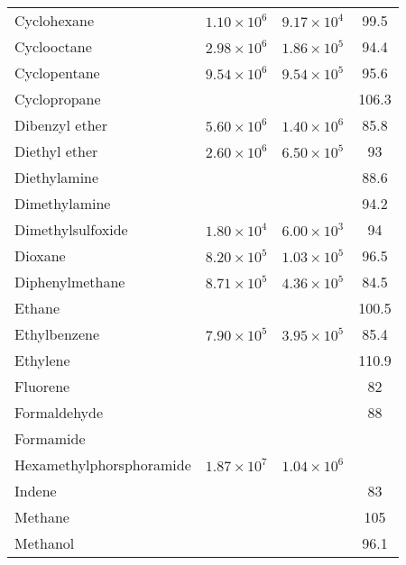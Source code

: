 \begin{center}
\begin{longtable}{l | c c c}
 Cyclohexane                    & $ 1.10 \times 10^6$ & $9.17 \times 10^4 $ &      99.5 \\
 Cyclooctane                    & $ 2.98 \times 10^6$ & $1.86 \times 10^5 $ &      94.4 \\
 Cyclopentane                   & $ 9.54 \times 10^6$ & $9.54 \times 10^5 $ &      95.6 \\
 Cyclopropane                   & $            $ & $            $ &     106.3 \\
 Dibenzyl ether                 & $ 5.60 \times 10^6$ & $1.40 \times 10^6 $ &      85.8 \\
 Diethyl ether                  & $ 2.60 \times 10^6$ & $6.50 \times 10^5 $ &        93 \\
 Diethylamine                   & $            $ & $            $ &      88.6 \\
 Dimethylamine                  & $            $ & $            $ &      94.2 \\
 Dimethylsulfoxide              & $ 1.80 \times 10^4$ & $6.00 \times 10^3 $ &        94 \\
 Dioxane                        & $ 8.20 \times 10^5$ & $1.03 \times 10^5 $ &      96.5 \\
 Diphenylmethane                & $ 8.71 \times 10^5$ & $4.36 \times 10^5 $ &      84.5 \\
 Ethane                         & $            $ & $            $ &     100.5 \\
 Ethylbenzene                   & $ 7.90 \times 10^5$ & $3.95 \times 10^5 $ &      85.4 \\
 Ethylene                       & $            $ & $            $ &     110.9 \\
 Fluorene                       & $            $ & $            $ &        82 \\
 Formaldehyde                   & $            $ & $            $ &        88 \\
 Formamide                      & $            $ & $            $ &           \\
 Hexamethylphorsphoramide       & $ 1.87 \times 10^7$ & $1.04 \times 10^6 $ &           \\
 Indene                         & $            $ & $            $ &        83 \\
 Methane                        & $            $ & $            $ &       105 \\
 Methanol                       & $            $ & $            $ &      96.1 \\

\end{longtable}
\end{center}
